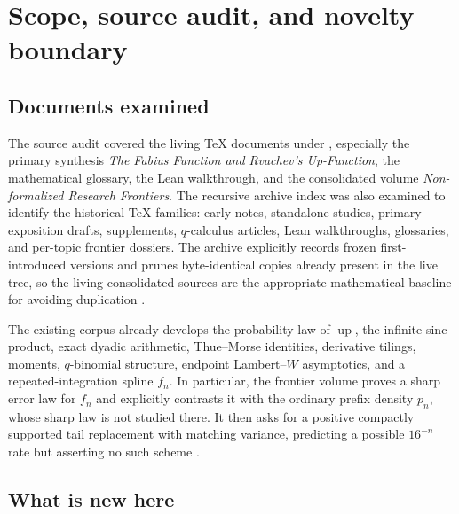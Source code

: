 \documentclass[11pt]{article}
\theoremstyle{definition}
\theoremstyle{remark}
\newcommand{\Up}{\operatorname{up}}
\begin{document}
\tableofcontents
\newpage

\section{Scope, source audit, and novelty boundary}
\label{sec:scope}

\subsection{Documents examined}

The source audit covered the living TeX documents under
, especially the primary synthesis
\emph{The Fabius Function and Rvachev's Up-Function}, the mathematical glossary,
the Lean walkthrough, and the consolidated volume
\emph{Non-formalized Research Frontiers}.  The recursive archive index was also
examined to identify the historical TeX families: early notes, standalone studies,
primary-exposition drafts, supplements, $q$-calculus articles, Lean walkthroughs,
glossaries, and per-topic frontier dossiers.  The archive explicitly records frozen
first-introduced versions and prunes byte-identical copies already present in the live
tree, so the living consolidated sources are the appropriate mathematical baseline
for avoiding duplication \cite{proveit-primary,proveit-frontiers,proveit-archive}.

The existing corpus already develops the probability law of $\Up$, the infinite sinc
product, exact dyadic arithmetic, Thue--Morse identities, derivative tilings, moments,
$q$-binomial structure, endpoint Lambert--$W$ asymptotics, and a repeated-integration
spline $f_n$.  In particular, the frontier volume proves a sharp error law for $f_n$
and explicitly contrasts it with the ordinary prefix density $p_n$, whose sharp law is
not studied there.  It then asks for a positive compactly supported tail replacement
with matching variance, predicting a possible $16^{-n}$ rate but asserting no such
scheme \cite{proveit-frontiers}.

\subsection{What is new here}
\end{document}
